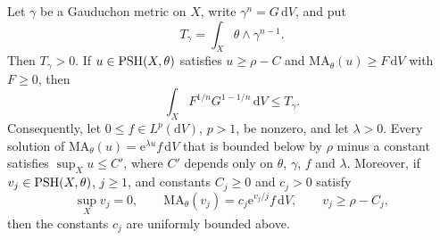 \begin{proposition}\label{prop:big-singular-gauduchon-trace}
Let $\gamma$ be a Gauduchon metric on $X$, write $\gamma^n=G\,\mathrm{d}V$, and put
\[
 T_\gamma=\int_X\theta\wedge\gamma^{n-1}.
\]
Then $T_\gamma>0$. If $u\in\mathrm{PSH}(X,\theta)$ satisfies $u\geq\rho-C$ and $\mathrm{MA}_\theta(u)\geq F\,\mathrm{d}V$ with $F\geq0$, then
\begin{equation}\label{eq:big-singular-gauduchon-trace}
 \int_X F^{1/n}G^{1-1/n}\,\mathrm{d}V\leq T_\gamma.
\end{equation}
Consequently, let $0\leq f\in L^p(\mathrm{d}V)$, $p>1$, be nonzero, and let $\lambda>0$. Every solution of $\mathrm{MA}_\theta(u)=\mathrm{e}^{\lambda u}f\,\mathrm{d}V$ that is bounded below by $\rho$ minus a constant satisfies $\sup_Xu\leq C'$, where $C'$ depends only on $\theta$, $\gamma$, $f$ and $\lambda$. Moreover, if $v_j\in\mathrm{PSH}(X,\theta)$, $j\geq1$, and constants $C_j\geq0$ and $c_j>0$ satisfy
\[
 \sup_Xv_j=0,\qquad
 \mathrm{MA}_\theta(v_j)=c_j \mathrm{e}^{v_j/j}f\,\mathrm{d}V,
 \qquad v_j\geq\rho-C_j,
\]
then the constants $c_j$ are uniformly bounded above.
\end{proposition}

